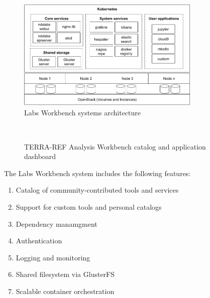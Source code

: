 \documentclass{sig-alternate}
\begin{document}
\begin{figure}[!ht]
\includegraphics[width=8.75cm]{architecture.png}
\caption{Labs Workbench systems architecture}
\label{fig.arch}
\end{figure}

\begin{figure}[!ht]
\\
\caption{TERRA-REF Analysis Workbench catalog and application dashboard}
\label{fig.ui}
\end{figure}

The Labs Workbench system includes the following features:
\begin{enumerate}
\itemsep-0.2em
\item Catalog of community-contributed tools and services
\item Support for custom tools and personal catalogs
\item Dependency manamgment
\item Authentication
\item Logging and monitoring
\item Shared filesystem via GlusterFS
\item Scalable container orchestration
\end{enumerate}
\end{document}
